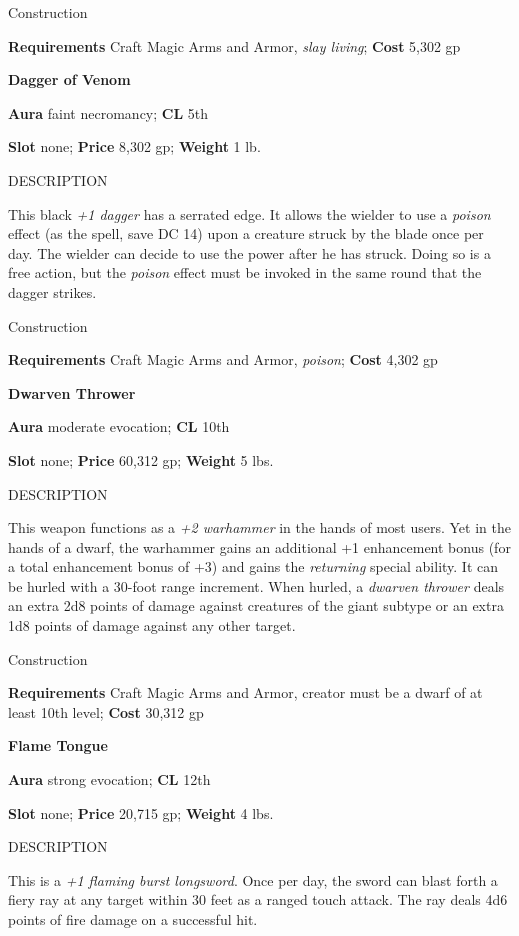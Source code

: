 Construction
				
\textbf{Requirements} Craft Magic Arms and Armor, \textit{slay living}; \textbf{Cost }5,302 gp
				
\textbf{Dagger of Venom}
				
\textbf{Aura} faint necromancy; \textbf{CL} 5th
				
\textbf{Slot} none; \textbf{Price} 8,302 gp; \textbf{Weight} 1 lb.
				
DESCRIPTION
				
This black \textit{+1 dagger} has a serrated edge. It allows the wielder to use a \textit{poison} effect (as the spell, save DC 14) upon a creature struck by the blade once per day. The wielder can decide to use the power after he has struck. Doing so is a free action, but the \textit{poison} effect must be invoked in the same round that the dagger strikes. 
				
Construction
				
\textbf{Requirements} Craft Magic Arms and Armor, \textit{poison}; \textbf{Cost }4,302 gp
				
\textbf{Dwarven Thrower}
				
\textbf{Aura} moderate evocation; \textbf{CL} 10th
				
\textbf{Slot} none; \textbf{Price} 60,312 gp; \textbf{Weight} 5 lbs.
				
DESCRIPTION
				
This weapon functions as a \textit{+2 warhammer} in the hands of most users. Yet in the hands of a dwarf, the warhammer gains an additional +1 enhancement bonus (for a total enhancement bonus of +3) and gains the \textit{returning} special ability. It can be hurled with a 30-foot range increment. When hurled, a \textit{dwarven thrower} deals an extra 2d8 points of damage against creatures of the giant subtype or an extra 1d8 points of damage against any other target. 
				
Construction
				
\textbf{Requirements} Craft Magic Arms and Armor, creator must be a dwarf of at least 10th level; \textbf{Cost }30,312 gp
				
\textbf{Flame Tongue}
				
\textbf{Aura} strong evocation; \textbf{CL} 12th
				
\textbf{Slot} none; \textbf{Price} 20,715 gp; \textbf{Weight} 4 lbs.
				
DESCRIPTION
				
This is a \textit{+1 flaming burst longsword}. Once per day, the sword can blast forth a fiery ray at any target within 30 feet as a ranged touch attack. The ray deals 4d6 points of fire damage on a successful hit. 
				
